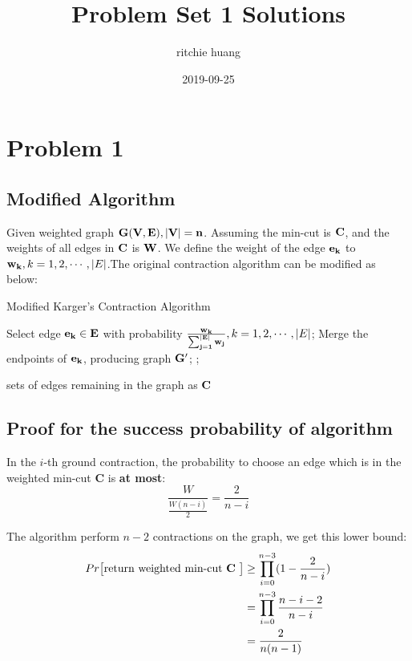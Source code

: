 \documentclass[a4paper, 12pt, titlepage]{article}
\title{Problem Set 1 Solutions}
\author{ritchie huang}
\date{2019-09-25}
\begin{document}
\section{Problem 1}

\subsection{Modified Algorithm}

Given weighted graph ${\bf G(V, E), |V| = n}$. Assuming the min-cut is ${\bf C}$, and the weights of all edges in ${\bf C}$ is ${\bf W}$.
We define the weight of the edge ${\bf e_k}$ to ${\bf w_{k}}, k = 1, 2, \cdots, |E|$.The original contraction algorithm can be modified as below:
\begin{algorithm}[h]
    \caption{Modified Karger's Contraction Algorithm}
    \begin{algorithmic}[1]

            \State Select edge ${\bf e_{k}} \in {\bf E}$ with probability ${\bf \frac{w_{k}}{\sum_{j = 1}^{|E|} w_{j}}}, k = 1, 2, \cdots, |E|$;
            \State Merge the endpoints of ${\bf e_{k}}$, producing graph ${\bf G'}$;
            ;
        \EndWhile

        \State \Return sets of edges remaining in the graph as ${\bf C}$
        \EndFunction
    \end{algorithmic}
\end{algorithm}


\subsection{Proof for the success probability of algorithm}

In the $i$-th ground contraction, the probability to choose an edge which is in the weighted min-cut {\bf C} is {\bf at most}:
\[
    \frac{W}{\frac{W (n - i)}{2}} = \frac{2}{n - i}
\]

The algorithm perform $n - 2$ contractions on the graph, we get this lower bound:
\begin{equation}
    \begin{aligned}
        Pr \big[ \text{return weighted min-cut \textbf{C} }\big] &\geq \prod_{i = 0}^{n - 3} (1 - \frac{2}{n - i}) \\
                                                 &= \prod_{i = 0}^{n - 3} \frac{ n - i - 2}{n - i} \\
                                                 &= \frac{2}{n ( n - 1)}
    \end{aligned}
\end{equation}
\end{document}
